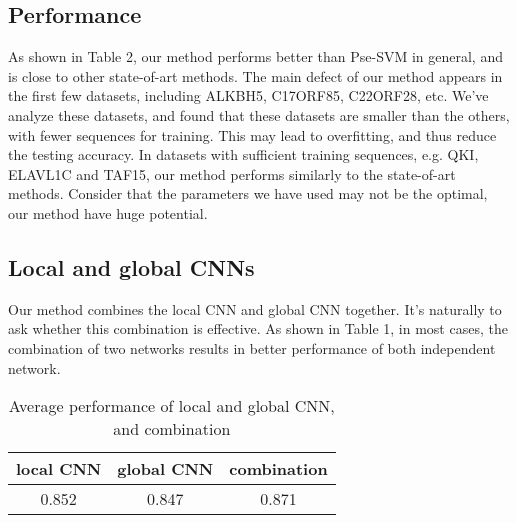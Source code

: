 \documentclass[twoside,twocolumn]{article}
\begin{document}
\subsection{Performance}
As shown in Table 2, our method performs better than Pse-SVM in general,
and is close to other state-of-art methods. The main defect of our method
appears in the first few datasets, including ALKBH5, C17ORF85, C22ORF28, etc.
We've analyze these datasets, and found that these datasets are smaller than the
others, with fewer sequences for training. This may lead to overfitting, and thus
reduce the testing accuracy.
In datasets with sufficient training sequences, e.g. QKI, ELAVL1C and TAF15, our
method performs similarly to the state-of-art methods. Consider that the parameters
we have used may not be the optimal, our method have huge potential.

\subsection{Local and global CNNs}
Our method combines the local CNN and global CNN together. It's naturally to ask
whether this combination is effective. As shown in Table 1, in most cases, the 
combination of two networks results in better performance of both independent
network. 
\begin{table}
  \caption{Average performance of local and global CNN, and combination}
  \centering
  \begin{tabular}{c|c|c}
    \toprule
    local CNN & global CNN & combination \\
    \midrule
    0.852 & 0.847 & 0.871 \\
    \bottomrule
  \end{tabular}
\end{table}
\end{document}
